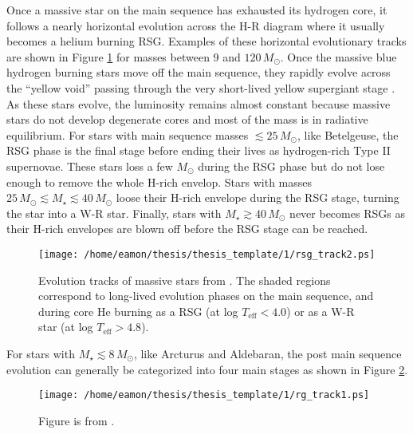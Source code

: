 Once a massive star on the main sequence has exhausted its  hydrogen core, it follows a nearly horizontal evolution across the H-R diagram where it usually becomes a helium burning RSG. Examples of these horizontal evolutionary tracks are shown in Figure \ref{fig:1.5.2.1} for masses between 9 and $120\,M_{\odot}$. Once the massive blue hydrogen burning stars move off the main sequence, they rapidly evolve across the ``yellow void'' passing through the very short-lived yellow supergiant stage \citep{levesque_2010}. As these stars evolve, the luminosity remains almost constant because massive stars do not develop degenerate cores and most of the mass is in radiative equilibrium. For stars with main sequence masses $\lesssim 25\,M_{\odot}$, like Betelgeuse, the RSG phase is the final stage before ending their lives as hydrogen-rich Type II supernovae. These stars loss a few $M_{\odot}$ during the RSG phase but do not lose enough to remove the whole H-rich envelop. Stars with masses $25\,M_{\odot}\lesssim M_{\star} \lesssim 40\,M_{\odot}$ loose their H-rich envelope during the RSG stage, turning the star into a W-R star. Finally, stars with $M_{\star} \gtrsim 40\,M_{\odot}$ never becomes RSGs as their H-rich envelopes are blown off before the RSG stage can be reached.

\begin{figure}[hbt!]
\centering 
          \texttt{[image: /home/eamon/thesis/thesis\_template/1/rsg\_track2.ps]}
\caption[Evolution tracks of massive stars.]{Evolution tracks of massive stars from \cite{maeder_1987}. The shaded regions correspond to long-lived evolution phases on the main sequence, and during core He burning as a RSG (at log $T_{\mathrm{eff}} < 4.0$) or as a W-R star (at log $T_{\mathrm{eff}} > 4.8$).}
\label{fig:1.5.2.1}
\end{figure}

For stars with $M_{\star} \lesssim 8\,M_{\odot}$, like Arcturus and Aldebaran, the post main sequence evolution can generally be categorized into four main stages as shown in Figure \ref{fig:1.5.2.2}.

\begin{figure}[hbt!]
\centering 
    \texttt{[image: /home/eamon/thesis/thesis\_template/1/rg\_track1.ps]}
\caption[Evolution track of an intermediate mass star.]{Figure is from \cite{iben_1967}.}
\label{fig:1.5.2.2}
\end{figure}

